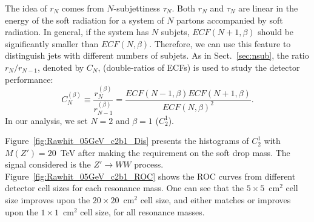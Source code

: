 The idea of $r_N$ comes from $N$-subjettiness $\tau_N$. Both $r_N$ and $\tau_N$ 
are linear in the energy of the soft radiation for a system of $N$ partons  accompanied 
by  soft radiation. In general, if the system has $N$ subjets, $ECF(N+1,\beta)$ 
should be significantly smaller than $ECF(N,\beta)$. Therefore, we can use this
 feature to distinguish jets with different numbers  of subjets. 
As in Sect.~\ref{sec:nsub}, the ratio $r_N/r_{N-1}$, denoted by $C_N$, 
(double-ratios of ECFs) is used to study the detector performance: 
\begin{equation}
C_{N}^{(\beta)}\equiv\frac{r_{N}^{(\beta)}}{r_{N-1}^{(\beta)}}=\frac{ECF(N-1,\beta)ECF(N+1,\beta)}{ECF(N,\beta)^2}.
\end{equation}
In our analysis, we set $N=2$ and $\beta=1$ ($C_2^1$).

Figure~\ref{fig:Rawhit_05GeV_c2b1_Dis} presents the histograms of $C_{2}^{1}$ 
with $M(Z')=20$~TeV after making the requirement on the soft drop mass. 
The signal considered is the $Z' \rightarrow WW$ process. 
Figure~\ref{fig:Rawhit_05GeV_c2b1_ROC} shows the ROC curves from different 
detector cell sizes for each resonance mass. One can see that 
the $5 \times 5$~$\mathrm{cm}^2$ cell size improves upon the $20 \times 20$~$\mathrm{cm}^2$ cell size, and either matches or improves upon the $1 \times 1$~$\mathrm{cm}^2$ cell size,
   for all resonance masses. 


